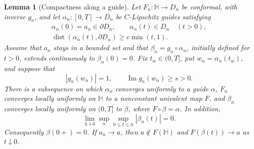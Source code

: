 \documentclass[11pt]{article}
\newtheorem{lemma}[theorem]{Lemma}
\theoremstyle{definition}
\theoremstyle{remark}
\numberwithin{equation}{section}
\begin{document}
\begin{lemma}[Compactness along a guide]\label{es:guide-compactness}
Let $F_n:\mathbb H\to D_n$ be conformal, with inverse $g_n$, and let
$\alpha_n:[0,T]\to\overline{D_n}$ be $C$-Lipschitz guides satisfying
\[
 \begin{gathered}
 \alpha_n(0)=a_n\in\partial D_n,\qquad
 \alpha_n(t)\in D_n\quad(t>0),\\
 \operatorname{dist}(\alpha_n(t),\partial D_n)
       \ge c\min(t,1).
 \end{gathered}
\]
Assume that $a_n$ stays in a bounded set and that
$\beta_n=g_n\circ\alpha_n$, initially defined for $t>0$, extends
continuously to $\beta_n(0)=0$.  Fix $t_w\in(0,T]$, put
$w_n=\alpha_n(t_w)$, and suppose that
\[
 |g_n(w_n)|=1,\qquad \operatorname{Im}g_n(w_n)\ge s>0.
\]
There is a subsequence on which $\alpha_n$ converges uniformly to a
guide $\alpha$, $F_n$ converges locally uniformly on $\mathbb H$ to a
nonconstant univalent map $F$, and $\beta_n$ converges locally uniformly
on $(0,T]$ to $\beta$, where $F\circ\beta=\alpha$.  In addition,
\begin{equation}\label{es:uniform-tip-collapse}
 \lim_{h\downarrow0}\sup_n\sup_{0\le t\le h}|\beta_n(t)|=0.
\end{equation}
Consequently $\beta(0+)=0$.  If $a_n\to a$, then $a\notin F(\mathbb H)$
and $F(\beta(t))\to a$ as $t\downarrow0$.
\end{lemma}
\end{document}
